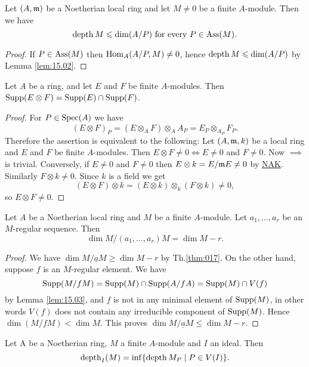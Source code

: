 \documentclass[../main]{subfiles}
\begin{document}
\begin{theorem}\label{thm:029}
Let $(A, \mathfrak{m})$ be a Noetherian local ring and let $M \neq 0$ be a finite $A$-module. Then we have \[\operatorname{depth} M \leqslant \operatorname{dim}(A / P)\text{ for every }P \in \operatorname{Ass}(M).\]
\end{theorem}

\begin{proof}
If $P \in \operatorname{Ass}(M)$ then $\operatorname{Hom}_A(A / P, M) \neq 0$, hence $\operatorname{depth} M\leqslant \operatorname{dim}(A / P)$ by Lemma \ref{lem:15.02}.
\end{proof}

\begin{parlemma}\label{lem:15.03}
Let $A$ be a ring, and let $E$ and $F$ be finite $A$-modules. Then $\operatorname{Supp}(E \otimes F)=\operatorname{Supp}(E) \cap \operatorname{Supp}(F)$.
\end{parlemma} 

\begin{proof}
For $P \in \operatorname{Spec}(A)$ we have \[(E \otimes F)_{P}=(E \otimes_{A} F) \otimes_{A} A_{P}= E_P \otimes_{A_P}F_P.\] Therefore the assertion is equivalent to the following: Let $(A, \mathfrak{m}, k)$ be a local ring and $E$ and $F$ be finite $A$-modules. Then $E \otimes F \neq 0 \iff E \neq 0$ and $F \neq 0$. Now $\implies$ is trivial. Conversely, if $E \neq 0$ and $F \neq 0$ then $E \otimes k=E /\mathfrak{m}E \neq 0$ by \hyperref[NAK]{NAK}. Similarly $F \otimes k \neq 0$. Since $k$ is a field we get \[(E \otimes F) \otimes k=(E \otimes k) \otimes_{k}(F \otimes k) \neq 0,\] so $E \otimes F \neq 0$.
\end{proof} 


\begin{lemma}\label{lem:15.04}
Let $A$ be a Noetherian local ring and $M$ be a finite $A$-module. Let $a_1,\ldots, a_r$ be an $M$-regular sequence. Then \[\dim M/(a_1, \ldots, a_r) M=\dim M-r.\]
\end{lemma} 

\begin{proof}
We have $\dim M / \underline{a}M \geqslant \dim M-r$ by Th.\ref{thm:017}. On the other hand, suppose $f$ is an $M$-regular element. We have \[\operatorname{Supp}(M / f M)=\operatorname{Supp}(M) \cap \operatorname{Supp}(A / f A)=\operatorname{Supp}(M) \cap V(f)\] by Lemma \ref{lem:15.03}, and $f$ is not in any minimal element of $\operatorname{Supp}(M)$, in other words $V(f)$ does not contain any irreducible component of $\operatorname{Supp}(M)$. Hence $\dim(M / f M)<\dim M$. This proves $\dim M / \underline{a}M \leqslant\dim M-r$.
\end{proof}

\begin{proposition}
Let A be a Noetherian ring, $M$ a finite $A$-module and $I$ an ideal. Then \[\operatorname{depth}_I(M)=\inf \{\operatorname{depth} M_P \mid P \in V(I)\}.\]
\end{proposition}
\end{document}
